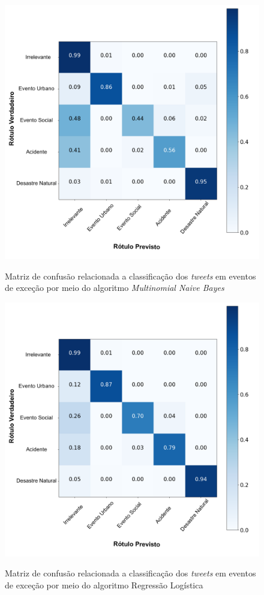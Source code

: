 \documentclass[
	12pt,				%
	oneside,			%
	a4paper,			%
	english,			%
	brazil				%
	]{abntex2ppgsi}
\begin{document}
{{\begin{apendicesenv}
\begin{figure}[!htb]
	\centering
 	  \caption{Matriz de confusão relacionada a classificação dos \textit{tweets} em eventos de exceção por meio do algoritmo \textit{Multinomial Naive Bayes}}
		\includegraphics[width=1\linewidth]{images/confusion_matrix_mnb_pt.png}
	\label{fig:confusion_matrix_mnb}
\end{figure}

\begin{figure}[!htb]
	\centering
 	  \caption{Matriz de confusão relacionada a classificação dos \textit{tweets} em eventos de exceção por meio do algoritmo Regressão Logística}
		\includegraphics[width=1\linewidth]{images/confusion_matrix_lr_pt.png}
	\label{fig:confusion_matrix_rl}
\end{figure}


\end{apendicesenv}}}
\end{document}
